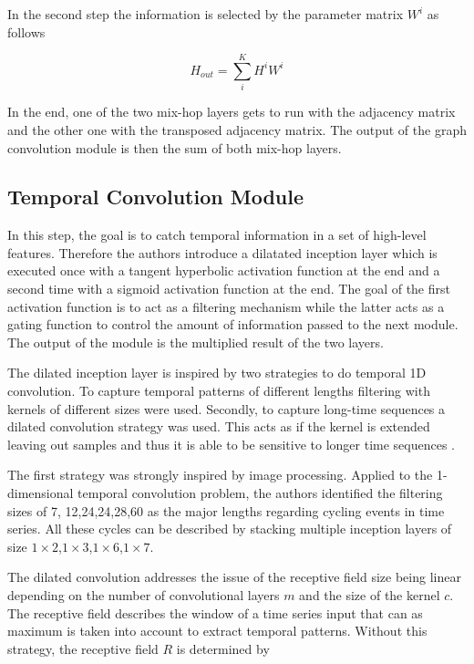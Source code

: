 \documentclass[letterpaper,twocolumn,11pt]{article}
\begin{document}
    In the second step the information is selected by the parameter matrix $W^{i}$ as follows

    \begin{equation}
        H_{out} =\sum_{i}^{K} H^i W^i  \label{eq:hop_selection}
    \end{equation}

    In the end, one of the two mix-hop layers gets to run with the adjacency matrix and the other one with the transposed adjacency matrix.
    The output of the graph convolution module is then the sum of both mix-hop layers.

    \subsection{Temporal Convolution Module}
    In this step, the goal is to catch temporal information in a set of high-level features.
    Therefore the authors introduce a dilatated inception layer which is executed once with a tangent hyperbolic activation function at the end
    and a second time with a sigmoid activation function at the end.
    The goal of the first activation function is to act as a filtering mechanism while the latter acts as a gating function
    to control the amount of information passed to the next module.
    The output of the module is the multiplied result of the two layers.

    The dilated inception layer is inspired by two strategies to do temporal 1D convolution.
    To capture temporal patterns of different lengths filtering with kernels of different sizes were used.
    Secondly, to capture long-time sequences a dilated convolution strategy was used.
    This acts as if the kernel is extended leaving out samples and thus it is able to be sensitive to longer time sequences \cite{xi2018deep}.

    The first strategy was strongly inspired by image processing.
    Applied to the 1-dimensional temporal convolution problem, the authors identified the filtering sizes of 7, 12,24,24,28,60
    as the major lengths regarding cycling events in time series.
    All these cycles can be described by stacking multiple inception layers of size $1 \times 2$,$1 \times 3$,$1 \times 6$,$1 \times 7$.

    The dilated convolution addresses the issue of the receptive field size being linear depending on the number of convolutional layers $m$ and the size of the kernel $c$.
    The receptive field describes the window of a time series input that can as maximum is taken into account to extract temporal patterns.
    Without this strategy, the receptive field $R$ is determined by
\end{document}
